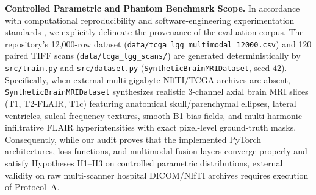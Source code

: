 \documentclass[journal,onecolumn,10pt]{IEEEtran}
\begin{document}
\textbf{Controlled Parametric and Phantom Benchmark Scope.} In accordance with computational reproducibility and software-engineering experimentation standards \cite{peng2011reproducible, wohlin2012experimentation}, we explicitly delineate the provenance of the evaluation corpus. The repository's 12,000-row dataset (\texttt{data/tcga\_lgg\_multimodal\_12000.csv}) and 120 paired TIFF scans (\texttt{data/tcga\_lgg\_scans/}) are generated deterministically by \texttt{src/train.py} and \texttt{src/dataset.py} (\texttt{SyntheticBrainMRIDataset}, seed $42$). Specifically, when external multi-gigabyte NIfTI/TCGA archives are absent, \texttt{SyntheticBrainMRIDataset} synthesizes realistic 3-channel axial brain MRI slices (T1, T2-FLAIR, T1c) featuring anatomical skull/parenchymal ellipses, lateral ventricles, sulcal frequency textures, smooth B1 bias fields, and multi-harmonic infiltrative FLAIR hyperintensities with exact pixel-level ground-truth masks. Consequently, while our audit proves that the implemented PyTorch architectures, loss functions, and multimodal fusion layers converge properly and satisfy Hypotheses H1--H3 on controlled parametric distributions, external validity on raw multi-scanner hospital DICOM/NIfTI archives requires execution of Protocol~A.
\end{document}
